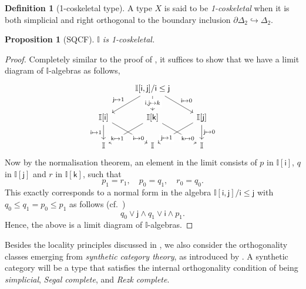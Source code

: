 \documentclass[a4paper,12pt]{amsart}
\newtheorem{proposition}[theorem]{Proposition}
\theoremstyle{definition}
\newtheorem{definition}[theorem]{Definition}
\newcommand{\mbb}[1]{\mathbb{#1}}
\newcommand{\I}{\mbb I}
\newcommand{\ms}[1]{\mathsf{#1}}
\newcommand{\hook}{\hookrightarrow}
\begin{document}
\begin{definition}[1-coskeletal type]
  A type $X$ is said to be \emph{1-coskeletal} when it is both simplicial and right orthogonal to the boundary inclusion $\partial\Delta_2 \hook \Delta_2$.
\end{definition}

\begin{proposition}[SQCF]\label{specis1t}
  $\I$ is 1-coskeletal.
\end{proposition}
\begin{proof}
  Completely similar to the proof of , it suffices to show that we have a limit diagram of $\I$-algebras as follows,
  \[\begin{tikzcd}
    & {\I[\ms{i},\ms{j}]/\ms{i}\le \ms{j}} \\
    \I[\ms{i}] & \I[\ms{k}] & \I[\ms{j}] \\
    \I & \I & \I
    \arrow["{\ms{j} \mapsto 1}"', from=1-2, to=2-1]
    \arrow["{\ms{i},\ms{j} \mapsto k}"{description}, from=1-2, to=2-2]
    \arrow["{\ms{i}\mapsto 0}", from=1-2, to=2-3]
    \arrow["\ms{i}\mapsto 1"', from=2-1, to=3-1]
    \arrow["\ms{i}\mapsto 0"{description, pos=0.75}, from=2-1, to=3-2]
    \arrow["\ms{k}\mapsto 1"{description, pos=0.75}, from=2-2, to=3-1]
    \arrow["\ms{k}\mapsto 0"{description, pos=0.75}, from=2-2, to=3-3]
    \arrow["\ms{j}\mapsto 1"{description, pos=0.75}, from=2-3, to=3-2]
    \arrow["\ms{j}\mapsto 0", from=2-3, to=3-3]
  \end{tikzcd}\]
  Now by the normalisation theorem, an element in the limit consists of $p$ in $\I[\ms{i}]$, $q$ in $\I[\ms{j}]$ and $r$ in $\I[\ms{k}]$, such that
  \[ p_1 = r_1, \quad p_0 = q_1, \quad r_0 = q_0\text{.} \]
  This exactly corresponds to a normal form in the algebra $\I[\ms{i},\ms{j}]/\ms{i}\le\ms{j}$ with $q_0 \le q_1 = p_0 \le p_1$ as follows (cf.\ )
  \[ q_0 \vee \ms{j} \wedge q_1 \vee \ms{i} \wedge p_1\text{.} \]
  Hence, the above is a limit diagram of $\I$-algebras.
\end{proof}

Besides the locality principles discussed in , we also consider the orthogonality classes emerging from \emph{synthetic category theory}, as introduced by \citet{riehl2017type}. 
A synthetic category will be a type that satisfies the internal orthogonality condition of being \emph{simplicial}, \emph{Segal complete}, and \emph{Rezk complete}.
\end{document}
